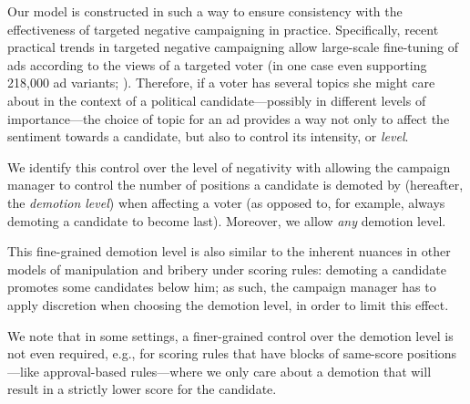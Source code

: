 \documentclass[letterpaper]{article} %
\begin{document}
Our model is constructed in such a way to ensure consistency with the effectiveness of targeted negative campaigning in practice. Specifically,
recent practical trends in targeted negative campaigning allow large-scale fine-tuning of ads according to the views of a targeted voter (in one case even supporting 218,000 ad variants; \citealp{guardian-trump-facebook-ad}). Therefore, if a voter has several topics she might care about in the context of a political candidate---possibly in different levels of importance---the choice of topic for an ad provides a way not only to affect  the sentiment towards a candidate, but also to control its intensity, or \emph{level}.

We identify this control over the level of negativity with allowing the campaign manager to control the number of positions a candidate is demoted by (hereafter, the \emph{demotion level}) when affecting a voter (as opposed to, for example, always demoting a candidate to become last). Moreover, we allow \emph{any} demotion level.

This fine-grained demotion level is also similar to the inherent nuances in other models of manipulation and bribery under scoring rules: demoting a candidate promotes some candidates below him; as such, the campaign manager has to apply discretion when choosing the demotion level, in order to limit this effect.

We note that in some settings, a finer-grained control over the demotion level is  not even required, e.g., for scoring rules that have blocks of same-score positions---like approval-based rules---where we only care about a demotion that will result in a strictly lower score for the candidate.





\end{document}

